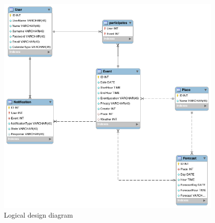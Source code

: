 \documentclass[10pt,a4paper,titlepage]{article}
\begin{document}
\begin{figure}[p]
\centering
\includegraphics[width=\linewidth]{./images/Logic_view}
\caption[Logical design view]{Logical design diagram}
\label{fig:Logic_view}
\end{figure}

\clearpage
\end{document}

